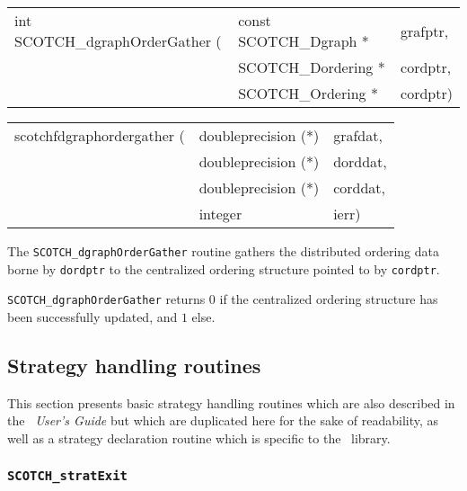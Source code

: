 \begin{itemize}
\progsyn

{\tt\begin{tabular}{l@{}ll}
int SCOTCH\_dgraphOrderGather ( & const SCOTCH\_Dgraph * & grafptr, \\
                                & SCOTCH\_Dordering *    & cordptr, \\
                                & SCOTCH\_Ordering *     & cordptr)
\end{tabular}}

{\tt\begin{tabular}{l@{}ll}
scotchfdgraphordergather ( & doubleprecision (*) & grafdat, \\
                           & doubleprecision (*) & dorddat, \\
                           & doubleprecision (*) & corddat, \\
                           & integer             & ierr)
\end{tabular}}

\progdes

The {\tt SCOTCH\_dgraph\lbt Order\lbt Gather} routine gathers the
distributed ordering data borne by {\tt dordptr} to the
centralized ordering structure pointed to by {\tt cordptr}.

\progret

{\tt SCOTCH\_dgraphOrderGather} returns $0$ if the centralized
ordering structure has been successfully updated, and $1$ else.
\end{itemize}

\subsection{Strategy handling routines}
\label{sec-lib-strat}

This section presents basic strategy handling routines which are also
described in the {\it\scotch\ User's Guide} but which are duplicated
here for the sake of readability, as well as a strategy declaration
routine which is specific to the \ptscotch\ library.

\subsubsection{{\tt SCOTCH\_stratExit}}

